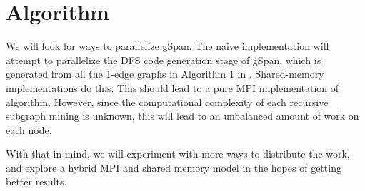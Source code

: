 \section{Algorithm}

We will look for ways to parallelize gSpan.  The naive implementation will
attempt to parallelize the DFS code generation stage of gSpan, which is
generated from all the 1-edge graphs in Algorithm 1 in \cite{gspan}.  
Shared-memory implementations do this.  This should lead to a pure 
MPI implementation of algorithm.  However, since the computational
complexity of each recursive subgraph mining is unknown, this will lead
to an unbalanced amount of work on each node. 

With that in mind, we will experiment with more ways to distribute the work, 
and explore a hybrid MPI and shared memory model in the hopes of getting
better results. 



